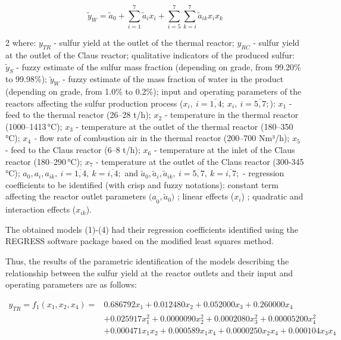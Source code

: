 \begin{equation}
{\widetilde{y}}_{W} = {\widetilde{a}}_{0} + \sum_{i = 1}^{7}{{\widetilde{a}}_{i}x_{i}} + \sum_{i = 5}^{7}{\sum_{k = i}^{7}{{\widetilde{a}}_{ik}x_{i}x_{k}}}
\end{equation}

\begin{multicols}{2}
where: \(y_{TR}\) - sulfur yield at the outlet of the thermal reactor;
\(y_{RC}\) - sulfur yield at the outlet of the Claus reactor;
qualitative indicators of the produced sulfur: \({\widetilde{y}}_{S}\) -
fuzzy estimate of the sulfur mass fraction (depending on grade, from
99.20\% to 99.98\%); \({\widetilde{y}}_{W}\) - fuzzy estimate of the
mass fraction of water in the product (depending on grade, from 1.0\% to
0.2\%); input and operating parameters of the reactors affecting the
sulfur production process
(\(x_{i},\ i = \overline{1,4};\ x_{i},\ i = \overline{5,7};\)):
\(x_{1}\) - feed to the thermal reactor (26--28 t/h); \(x_{2}\) -
temperature in the thermal reactor (1000--1413\,°C); \(x_{3}\) -
temperature at the outlet of the thermal reactor (180--350\,°C);
\(x_{4}\) \emph{-} flow rate of combustion air in the thermal reactor
(200--700 Nm³/h); \(x_{5}\) - feed to the Claus reactor (6--8 t/h);
\(x_{6}\) - temperature at the inlet of the Claus reactor
(180--290\,°C); \(x_{7}\) - temperature at the outlet of the Claus
reactor (300-345\,°C);
\(a_{0},a_{i},a_{ik},\ i = \overline{1,4},\ k = \overline{i,4};\) and
\({\widetilde{a}}_{0},{\widetilde{a}}_{i},{\widetilde{a}}_{ik},\ i = \overline{5,7},\ k = \overline{i,7};\)
- regression coefficients to be identified (with crisp and fuzzy
notations): constant term affecting the reactor outlet parameters
\({(a}_{0},{\widetilde{a}}_{0})\) ; linear effects (\(x_{i}\)) ;
quadratic and interaction effects (\(x_{ik}\)).

The obtained models (1)-(4) had their regression coefficients identified
using the REGRESS software package based on the modified least squares
method.

Thus, the results of the parametric identification of the models
describing the relationship between the sulfur yield at the reactor
outlets and their input and operating parameters are as follows:
\end{multicols}
\vspace{-2em}
\begin{equation*}
\begin{split}
y_{TR} = f_{1}(x_{1}, x_{2}, x_{4}) = &0.686792 x_{1} + 0.012480 x_{2} + 0.052000 x_{3} + 0.260000 x_{4} \\
&+ 0.025917 x_{1}^{2} + 0.0000090 x_{2}^{2} + 0.0002080 x_{3}^{2} + 0.00005200 x_{4}^{2} \\
&+ 0.000471 x_{1} x_{2} + 0.000589 x_{1} x_{4} + 0.0000250 x_{2} x_{4} + 0.000104 x_{3} x_{4}
\end{split}
\end{equation*}

